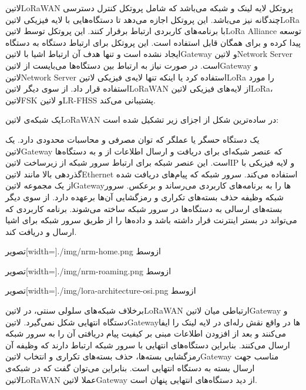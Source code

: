 ‌لاتین{LoRaWAN} پروتکل لایه لینک و شبکه می‌باشد که شامل پروتکل کنترل دسترسی چندگانه نیز می‌باشد.
این پروتکل اجازه می‌دهد تا دستگاه‌هایی با لایه فیزیکی ‌لاتین{LoRa} با برنامه‌های کاربردی ارتباط برقرار کنند.
این پروتکل توسط ‌لاتین{LoRa Alliance} توسعه پیدا کرده و برای همگان قابل استفاده است.
این پروتکل برای ارتباط دستگاه به دستگاه ایجاد نشده است و تنها هدف آن ارتباط اشیا با ‌لاتین{Gateway} و ‌لاتین{Network Server} است.
در صورت نیاز به ارتباط بین دستگاه‌ها می‌بایست از ‌لاتین{Gateway} و ‌لاتین{Network Server} استفاده کرد یا اینکه
تنها لایه‌ی فیزیکی ‌لاتین{LoRa} را مورد استفاده قرار داد.
از سوی دیگر ‌لاتین{LoRaWAN} از لایه‌های فیزیکی ‌لاتین{LoRa}، ‌لاتین{FSK} و ‌لاتین{LR-FHSS} پشتیبانی می‌کند.

یک شبکه‌ی ‌لاتین{LoRaWAN} در ساده‌ترین شکل از اجزای زیر تشکیل شده است:

 یک دستگاه حسگر یا عملگر که توان مصرفی و محاسبات محدودی دارد.
 یک ‌لاتین{Gateway} که عنصر شبکه‌ای برای دریافت و ارسال اطلاعات از و به دستگاه‌ها است. این عنصر شبکه برای ارتباط سرور شبکه
از زیرساخت ‌لاتین{IP} و لایه فیزیکی با گذردهی بالا مانند ‌لاتین{Ethernet} استفاده می‌کند.
 سرور شبکه که پیام‌های دریافت شده از یک مجموعه ‌لاتین{Gateway}ها را به برنامه‌های کاربردی می‌رساند و برعکس.
سرور شبکه وظیفه حذف بسته‌های تکراری
و رمزگشایی آن‌ها برعهده دارد. از سوی دیگر بسته‌های ارسالی به دستگاه‌ها در سرور شبکه ساخته می‌شوند.
 برنامه کاربردی که می‌تواند در بستر اینترنت قرار داشته باشد و داده‌ها را از طریق سرور شبکه برای اشیا ارسال و دریافت کند.

‌تصویر[width=\textwidth]{./img/nrm-home.png}
‌ازوسط

‌تصویر[width=\textwidth]{./img/nrm-roaming.png}
‌ازوسط

‌تصویر[width=\textwidth]{./img/lora-architecture-osi.png}
‌ازوسط

برخلاف شبکه‌های سلولی سنتی، در ‌لاتین{LoRaWAN} ارتباطی میان ‌لاتین{Gateway} و دستگاه انتهایی شکل نمی‌گیرد.
‌لاتین{Gateway}ها در واقع نقش رله‌ای در لایه لینک را ایفا می‌کنند و بعد از افزودن اطلاعات مبنی بر کیفیت پیام دریافتی آن
را به سرور شبکه ارسال می‌کنند. بنابراین دستگاه‌های انتهایی با سرور شبکه ارتباط دارند که وظیفه آن رمزگشایی بسته‌ها، حذف بسته‌های تکراری و
انتخاب ‌لاتین{Gateway} مناسب جهت ارسال بسته به دستگاه انتهایی است.
بنابراین می‌توان گفت که در شبکه‌ی ‌لاتین{LoRaWAN} عملا ‌لاتین{Gateway} از دید دستگاه‌های انتهایی پنهان است.

